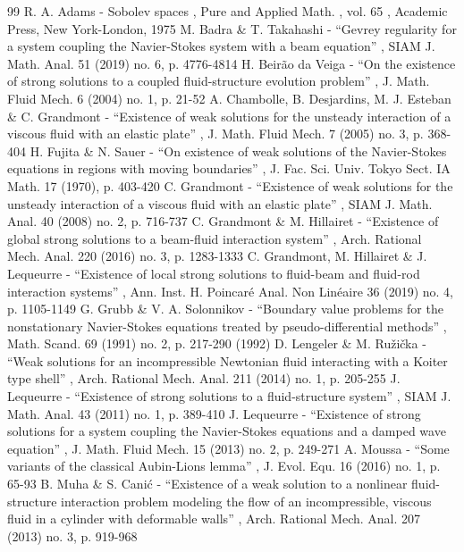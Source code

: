 \begin{thebibliography}{99}
 R. A. Adams - Sobolev spaces , Pure and Applied Math. , vol. 65 , Academic Press, New York-London, 1975
 M. Badra \& T. Takahashi - “Gevrey regularity for a system coupling the Navier-Stokes system with a beam equation” , SIAM J. Math. Anal. 51 (2019) no. 6, p. 4776-4814
 H. Beirão da Veiga - “On the existence of strong solutions to a coupled fluid-structure evolution problem” , J. Math. Fluid Mech. 6 (2004) no. 1, p. 21-52
 A. Chambolle, B. Desjardins, M. J. Esteban \& C. Grandmont - “Existence of weak solutions for the unsteady interaction of a viscous fluid with an elastic plate” , J. Math. Fluid Mech. 7 (2005) no. 3, p. 368-404
 H. Fujita \& N. Sauer - “On existence of weak solutions of the Navier-Stokes equations in regions with moving boundaries” , J. Fac. Sci. Univ. Tokyo Sect. IA Math. 17 (1970), p. 403-420
 C. Grandmont - “Existence of weak solutions for the unsteady interaction of a viscous fluid with an elastic plate” , SIAM J. Math. Anal. 40 (2008) no. 2, p. 716-737
 C. Grandmont \& M. Hillairet - “Existence of global strong solutions to a beam-fluid interaction system” , Arch. Rational Mech. Anal. 220 (2016) no. 3, p. 1283-1333
 C. Grandmont, M. Hillairet \& J. Lequeurre - “Existence of local strong solutions to fluid-beam and fluid-rod interaction systems” , Ann. Inst. H. Poincaré Anal. Non Linéaire 36 (2019) no. 4, p. 1105-1149
 G. Grubb \& V. A. Solonnikov - “Boundary value problems for the nonstationary Navier-Stokes equations treated by pseudo-differential methods” , Math. Scand. 69 (1991) no. 2, p. 217-290 (1992)
 D. Lengeler \& M. Ružička - “Weak solutions for an incompressible Newtonian fluid interacting with a Koiter type shell” , Arch. Rational Mech. Anal. 211 (2014) no. 1, p. 205-255
 J. Lequeurre - “Existence of strong solutions to a fluid-structure system” , SIAM J. Math. Anal. 43 (2011) no. 1, p. 389-410
 J. Lequeurre - “Existence of strong solutions for a system coupling the Navier-Stokes equations and a damped wave equation” , J. Math. Fluid Mech. 15 (2013) no. 2, p. 249-271
 A. Moussa - “Some variants of the classical Aubin-Lions lemma” , J. Evol. Equ. 16 (2016) no. 1, p. 65-93
 B. Muha \& S. Canić - “Existence of a weak solution to a nonlinear fluid-structure interaction problem modeling the flow of an incompressible, viscous fluid in a cylinder with deformable walls” , Arch. Rational Mech. Anal. 207 (2013) no. 3, p. 919-968

\end{thebibliography}
